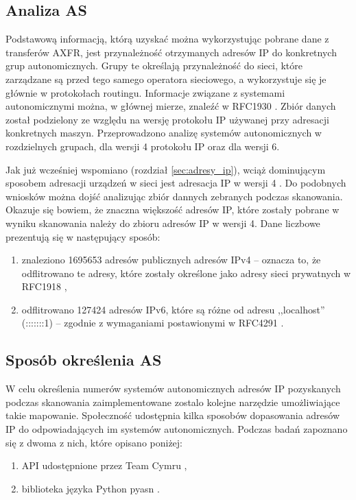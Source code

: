 \subsection{Analiza AS}
Podstawową informacją, którą uzyskać można wykorzystując pobrane dane z transferów AXFR, jest przynależność otrzymanych adresów IP
do konkretnych grup autonomicznych. Grupy te określają przynależność do sieci, które zarządzane są przed tego samego operatora
sieciowego, a wykorzystuje się je głównie w protokołach routingu. Informacje związane z systemami autonomicznymi można, w głównej
mierze, znaleźć w RFC1930 \cite{RFC1930}. Zbiór danych został podzielony ze względu na wersję protokołu IP używanej przy adresacji
konkretnych maszyn. Przeprowadzono analizę systemów autonomicznych w rozdzielnych grupach, dla wersji 4 protokołu IP oraz dla wersji 6.

Jak już wcześniej wspomiano (rozdział \ref{sec:adresy_ip}), wciąż dominującym sposobem adresacji urządzeń w sieci jest adresacja
IP w wersji 4 \cite{Ipv6_deployment}.
Do podobnych wniosków można dojść analizując zbiór dannych zebranych podczas skanowania. Okazuje się bowiem, że znaczna większość
adresów IP, które zostały pobrane w wyniku skanowania należy do zbioru adresów IP w wersji 4. Dane liczbowe prezentują się w
następujący sposób:
\begin{enumerate}
	\item znaleziono 1695653 adresów publicznych adresów IPv4 -- oznacza to, że odflitrowano te adresy, które zostały określone
	jako adresy sieci prywatnych w RFC1918 \cite{RFC1918},
	\item odflitrowano 127424 adresów IPv6, które są różne od adresu ,,localhost'' (:::::::1) -- zgodnie z wymaganiami postawionymi
	w RFC4291 \cite{RFC4291}.
\end{enumerate}

\subsection{Sposób określenia AS}
W celu określenia numerów systemów autonomicznych adresów IP pozyskanych podczas skanowania zaimplementowane zostalo kolejne
narzędzie umożliwiające takie mapowanie. Społeczność udostępnia kilka sposobów dopasowania adresów IP do odpowiadających im
systemów autonomicznych. Podczas badań zapoznano się z dwoma z nich, które opisano poniżej:
\begin{enumerate}
	\item API udostępnione przez Team Cymru \cite{cymru},
	\item biblioteka języka Python pyasn \cite{pyasn}.
\end{enumerate}

